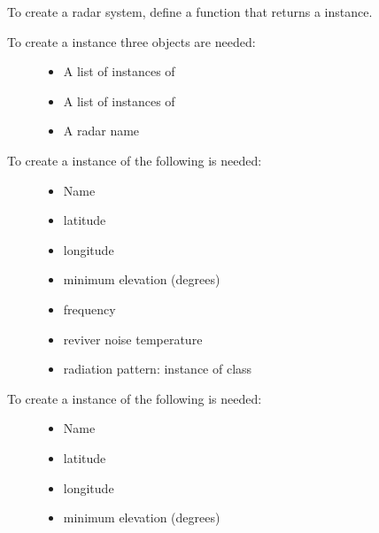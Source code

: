 \documentclass[letterpaper,10pt,english]{sphinxmanual}
\begin{document}
To create a radar system, define a function that returns a  instance.
\begin{description}
\item[{To create a  instance three objects are needed:}] \leavevmode\begin{itemize}
\item {} 
A list of instances of 

\item {} 
A list of instances of 

\item {} 
A radar name

\end{itemize}

\item[{To create a instance of  the following is needed:}] \leavevmode\begin{itemize}
\item {} 
Name

\item {} 
latitude

\item {} 
longitude

\item {} 
minimum elevation (degrees)

\item {} 
frequency

\item {} 
reviver noise temperature

\item {} 
radiation pattern: instance of  class

\end{itemize}

\item[{To create a instance of  the following is needed:}] \leavevmode\begin{itemize}
\item {} 
Name

\item {} 
latitude

\item {} 
longitude

\item {} 
minimum elevation (degrees)


\end{itemize}
\end{description}
\end{document}
